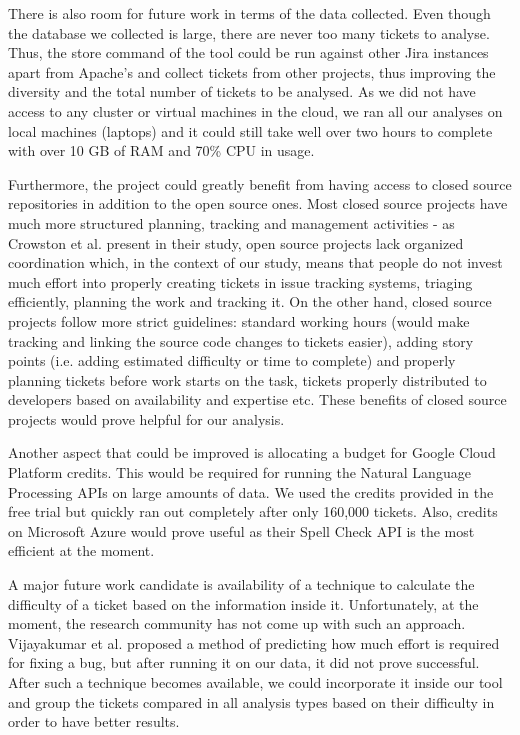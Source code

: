 \documentclass{mpaper}
\begin{document}
There is also room for future work in terms of the data collected. Even though the database we collected 
is large, there are never too many tickets to analyse. Thus, the store command of the tool could be run against 
other Jira instances apart from Apache's and collect tickets from other projects, thus improving the diversity 
and the total number of tickets to be analysed. As we did not have access to any cluster or virtual machines in 
the cloud, we ran all our analyses on local machines (laptops) and it could still take well over two hours to complete 
with over 10 GB of RAM and 70\% CPU in usage.

Furthermore, the project could greatly benefit from having access to closed source repositories in addition to the 
open source ones. Most closed source projects have much more structured planning, tracking and management activities - as 
Crowston et al. \cite{crowston2012free} present in their study, open source projects lack organized coordination which,
in the context of our study, means that people do not invest much effort into properly creating tickets in issue tracking 
systems, triaging efficiently, planning the work and tracking it. On the other hand, closed source projects follow 
more strict guidelines: standard working hours (would make tracking and linking the source code changes to tickets easier), 
adding story points (i.e. adding estimated difficulty or time to complete) and properly planning tickets before work 
starts on the task, tickets properly distributed to developers based on availability and expertise etc. These benefits 
of closed source projects would prove helpful for our analysis.

Another aspect that could be improved is allocating a budget for Google Cloud Platform credits. This 
would be required for running the Natural Language Processing APIs on large amounts of data. We used the credits provided 
in the free trial but quickly ran out completely after only 160,000 tickets. Also, credits on Microsoft Azure would 
prove useful as their Spell Check API is the most efficient at the moment.

A major future work candidate is availability of a technique to calculate the difficulty of a ticket based on the information
inside it. Unfortunately, at the moment, the research community has not come up with such an approach. 
Vijayakumar et al. \cite{vijayakumar2014much} proposed a method of predicting how much effort is required for fixing 
a bug, but after running it on our data, it did not prove successful. After such a technique becomes available, we could 
incorporate it inside our tool and group the tickets compared in all analysis types based on their difficulty in order to 
have better results.
\end{document}
